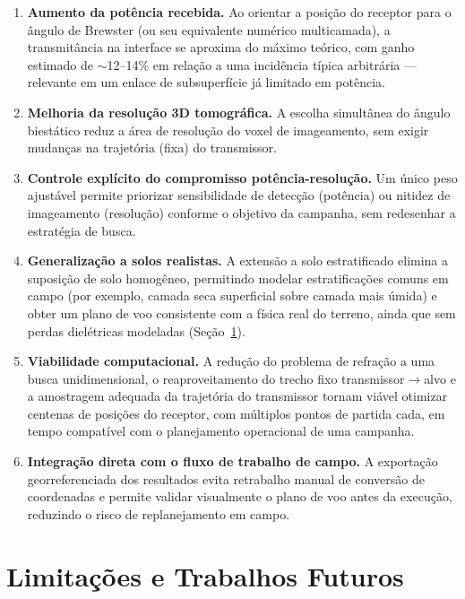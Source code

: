 \documentclass[11pt,a4paper]{article}
\begin{document}
\begin{enumerate}
  \item \textbf{Aumento da potência recebida.} Ao orientar a posição do receptor para o ângulo de
  Brewster (ou seu equivalente numérico multicamada), a transmitância na interface se aproxima do
  máximo teórico, com ganho estimado de $\sim$12--14\% em relação a uma incidência típica
  arbitrária — relevante em um enlace de subsuperfície já limitado em potência.

  \item \textbf{Melhoria da resolução 3D tomográfica.} A escolha simultânea do ângulo biestático
  reduz a área de resolução do voxel de imageamento, sem exigir mudanças na trajetória (fixa) do
  transmissor.

  \item \textbf{Controle explícito do compromisso potência-resolução.} Um único peso ajustável
  permite priorizar sensibilidade de detecção (potência) ou nitidez de imageamento (resolução)
  conforme o objetivo da campanha, sem redesenhar a estratégia de busca.

  \item \textbf{Generalização a solos realistas.} A extensão a solo estratificado elimina a
  suposição de solo homogêneo, permitindo modelar estratificações comuns em campo (por exemplo,
  camada seca superficial sobre camada mais úmida) e obter um plano de voo consistente com a
  física real do terreno, ainda que sem perdas dielétricas modeladas (Seção~\ref{sec:limitacoes}).

  \item \textbf{Viabilidade computacional.} A redução do problema de refração a uma busca
  unidimensional, o reaproveitamento do trecho fixo transmissor$\to$alvo e a amostragem adequada
  da trajetória do transmissor tornam viável otimizar centenas de posições do receptor, com
  múltiplos pontos de partida cada, em tempo compatível com o planejamento operacional de uma
  campanha.

  \item \textbf{Integração direta com o fluxo de trabalho de campo.} A exportação georreferenciada
  dos resultados evita retrabalho manual de conversão de coordenadas e permite validar visualmente
  o plano de voo antes da execução, reduzindo o risco de replanejamento em campo.
\end{enumerate}

\section{Limitações e Trabalhos Futuros}
\label{sec:limitacoes}
\end{document}
